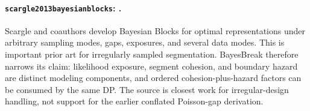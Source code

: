 
\paragraph{\texttt{scargle2013bayesianblocks}: \citet{scargle2013bayesianblocks}.}
Scargle and coauthors develop Bayesian Blocks for optimal representations under arbitrary sampling modes, gaps, exposures, and several data modes. This is important prior art for irregularly sampled segmentation. BayesBreak therefore narrows its claim: likelihood exposure, segment cohesion, and boundary hazard are distinct modeling components, and ordered cohesion-plus-hazard factors can be consumed by the same DP. The source is closest work for irregular-design handling, not support for the earlier conflated Poisson-gap derivation.
